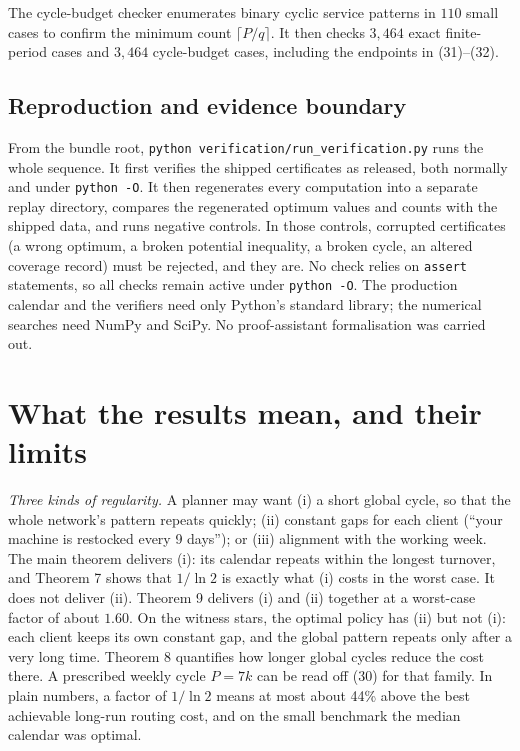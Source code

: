 \documentclass[
  british,
  11pt,
  a4paper,
]{article}
\begin{document}
The cycle-budget checker enumerates binary cyclic service patterns in
\(110\) small cases to confirm the minimum count \(\lceil P/q\rceil\).
It then checks \(3,464\) exact finite-period cases and \(3,464\)
cycle-budget cases, including the endpoints in (31)--(32).

\subsection{Reproduction and evidence
boundary}\label{reproduction-and-evidence-boundary}

From the bundle root, \texttt{python\ verification/run\_verification.py}
runs the whole sequence. It first verifies the shipped certificates as
released, both normally and under \texttt{python\ -O}. It then
regenerates every computation into a separate replay directory, compares
the regenerated optimum values and counts with the shipped data, and
runs negative controls. In those controls, corrupted certificates (a
wrong optimum, a broken potential inequality, a broken cycle, an altered
coverage record) must be rejected, and they are. No check relies on
\texttt{assert} statements, so all checks remain active under
\texttt{python\ -O}. The production calendar and the verifiers need only
Python's standard library; the numerical searches need NumPy and SciPy.
No proof-assistant formalisation was carried out.

\section{What the results mean, and their
limits}\label{what-the-results-mean-and-their-limits}

\emph{Three kinds of regularity.} A planner may want (i) a short global
cycle, so that the whole network's pattern repeats quickly; (ii)
constant gaps for each client (``your machine is restocked every 9
days''); or (iii) alignment with the working week. The main theorem
delivers (i): its calendar repeats within the longest turnover, and
Theorem 7 shows that \(1/\ln2\) is exactly what (i) costs in the worst
case. It does not deliver (ii). Theorem 9 delivers (i) and (ii) together
at a worst-case factor of about \(1.60\). On the witness stars, the
optimal policy has (ii) but not (i): each client keeps its own constant
gap, and the global pattern repeats only after a very long time. Theorem
8 quantifies how longer global cycles reduce the cost there. A
prescribed weekly cycle \(P=7k\) can be read off (30) for that family.
In plain numbers, a factor of \(1/\ln2\) means at most about 44\% above
the best achievable long-run routing cost, and on the small benchmark
the median calendar was optimal.
\end{document}

